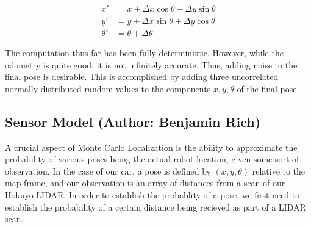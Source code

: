 \documentclass{article}
\begin{document}
\begin{align}
    x' & = x+\Delta x\cos\theta-\Delta y\sin\theta \nonumber \\
    y' & = y+\Delta x\sin\theta+\Delta y\cos\theta \nonumber \\
    \theta' & = \theta+\Delta\theta \nonumber
\end{align}

The computation thus far has been fully deterministic. However, while the odometry is quite good, it is not infinitely accurate. Thus, adding noise to the final pose is desirable. This is accomplished by adding three uncorrelated normally distributed random values to the components $x,y,\theta$ of the final pose.

\subsection{Sensor Model (Author: Benjamin Rich)}
A crucial aspect of Monte Carlo Localization is the ability to approximate the probability of various poses being the actual robot location, given some sort of observation. In the case of our car, a pose is defined by $(x,y,\theta)$ relative to the map frame, and our observation is an array of distances from a scan of our Hokuyo LIDAR. In order to establish the probablity of a pose, we first need to establish the probability of a certain distance being recieved as part of a LIDAR scan. \\
\end{document}
